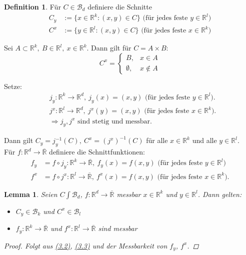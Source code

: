 \documentclass[a4paper]{scrreprt}
\newcommand{\R}{\mathbb{R}}
\newcommand{\Rq}{\overline{\R}}
\newcommand{\Borel}{\mathcal{B}}
\newcommand{\Bd}{\Borel_d}
\newcommand{\jlabel}[1]{\label{j_#1}}
\newcommand{\jhyperref}[2]{\hyperref[j_#1]{#2}}
\newcommand{\jlink}[1]{\jhyperref{#1}{#1}}
\newcommand{\jabb}[3]{ #1: #2 \rightarrow #3 }
\theoremstyle{plain}
\newtheorem{lem}[thm]{Lemma}
\theoremstyle{definition}
\newtheorem*{defn*}{Definition}
\begin{document}
{{{{\begin{defn*}
    Für $C\in\Bd$ definiere die Schnitte
    \begin{displaymath}
        \begin{split}
            C_y &:= \{x\in \R^k: (x,y) \in C\} \text{  (für jedes feste $y\in\R^l$)}\\
            C^x &:= \{y\in \R^l: (x,y) \in C\} \text{  (für jedes feste $x\in\R^k$)}
        \end{split}
    \end{displaymath}

    Sei $A\subset \R^k, \ B \in \R^l, \ x \in \R^k$. Dann gilt für $C = A\times B$:
    \jlabel{(3.1)}
    \begin{equation}
        C^x = \begin{cases} B, &x\in A\\ \emptyset, &x\notin A \end{cases}
    \end{equation}

    Setze:
    \jlabel{(3.2)}
    \begin{equation}
        \begin{split}
            &\jabb{j_y}{\R^k}{\R^d}, \ j_y(x) = (x,y) \text{  (für jedes feste $y\in \R^l$).}\\
            &\jabb{j^x}{\R^l}{\R^d}, \ j^x(y) = (x,y) \text{  (für jedes feste $x\in \R^k$).}\\
            &\Rightarrow j_y, j^x \text{ sind stetig und messbar.}
        \end{split}
    \end{equation}

    Dann gilt $C_y = j_y^{-1}(C), \ C^x = (j^x)^{-1}(C)$ für alle $x\in \R^k$ und alle $y\in \R^l$.\\
    Für $\jabb{f}{\R^d}{\Rq}$ definiere die Schnittfunktionen:
    \jlabel{(3.3)}
    \begin{equation}
        \begin{split}
            f_y &= \jabb{f\circ j_y}{\R^k}{\Rq}, \ f_y(x) = f(x,y) \text{  (für jedes feste $y\in \R^l$)}\\
            f^x &= \jabb{f\circ j^x}{\R^l}{\Rq}, \ f^x(x) = f(x,y) \text{  (für jedes feste $x\in \R^k$)}.
        \end{split}
    \end{equation}
\end{defn*}

\begin{lem}
\jlabel{Lem 3.18}
    Seien $C\int \Bd$, $ \jabb{f}{\R^d}{\Rq}$ messbar $x\in \R^k$ und $y\in \R^l$. Dann gelten:
    \begin{itemize}
        \item $C_y\in \Borel_k$ und $C^x \in \Borel_l$
        \item $\jabb{f_y}{\R^k}{\Rq}$ und $\jabb{f^x}{\R^l}{\Rq}$ sind messbar
    \end{itemize}
    \begin{proof}
        Folgt aus \jlink{(3.2)}, \jlink{(3.3)} und der Messbarkeit von $f_y$, $f^x$.
    \end{proof}
\end{lem}

}}}}
\end{document}
